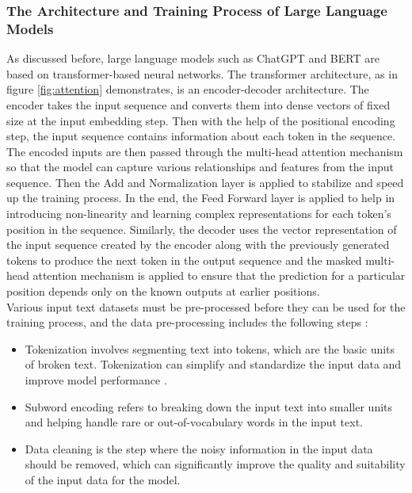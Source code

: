 \documentclass[runningheads]{llncs}
\begin{document}
\subsubsection{The Architecture and Training Process of Large Language Models}
\noindent \newline
As discussed before, large language models such as ChatGPT and BERT are based on transformer-based neural networks. The transformer architecture, as \cite{Vaswani17} in figure \ref{fig:attention} demonstrates, is an 
encoder-decoder architecture. The encoder takes the input sequence and converts them into dense vectors of fixed size at the input embedding step. Then with the 
help of the positional encoding step, the input sequence contains information about each token in the sequence. The encoded inputs are then passed through the multi-head attention mechanism so that the 
model can capture various relationships and features from the input sequence. Then the Add and Normalization layer is applied to stabilize and speed up the training process. In the end, the Feed Forward layer is 
applied to help in introducing non-linearity and learning complex representations for each token's position in the sequence. Similarly, the decoder uses the vector representation of the input sequence created
by the encoder along with the previously generated tokens to produce the next token in the output sequence and the masked multi-head attention mechanism is applied to ensure that the prediction for a particular position depends only on the known outputs at earlier positions. \\
\noindent \newline
Various input text datasets must be pre-processed before they can be used for the training process, and the data pre-processing includes the following steps \cite{Roum23}:
\begin{itemize}
  \item Tokenization involves segmenting text into tokens, which are the basic units of broken text. Tokenization can simplify and standardize the input data and improve model performance \cite{Devlin18}.
  \item Subword encoding refers to breaking down the input text into smaller units and helping handle rare or out-of-vocabulary words in the input text.
  \item Data cleaning is the step where the noisy information in the input data should be removed, which can significantly improve the quality and suitability of the input data for the model.
\end{itemize} 
\end{document}
